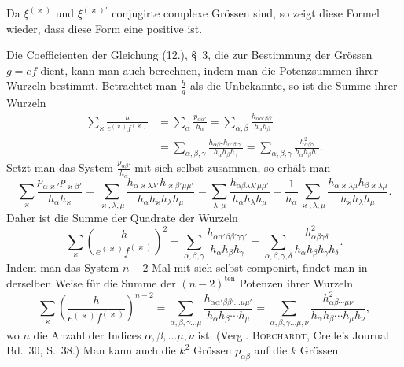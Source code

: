 \documentclass[11pt]{article}
\begin{document}
Da $\xi^{(\varkappa)}$ und $\xi^{(\varkappa)'}$ conjugirte complexe Grössen sind, so zeigt diese Formel wieder, dass diese Form eine positive ist.

Die Coefficienten der Gleichung (12.), \S~3, die zur Bestimmung der Grössen $g=ef$ dient, kann man auch berechnen, indem man die Potenzsummen ihrer Wurzeln bestimmt. Betrachtet man $\frac{h}{g}$ als die Unbekannte, so ist die Summe ihrer Wurzeln
\[
\begin{aligned}
\sum_\varkappa \frac{h}{e^{(\varkappa)}f^{(\varkappa)}}
&=\sum_\alpha \frac{p_{\alpha\alpha'}}{h_\alpha}
=\sum_{\alpha,\beta}\frac{h_{\alpha\alpha'\beta\beta'}}{h_\alpha h_\beta} \\
&=\sum_{\alpha,\beta,\gamma}\frac{h_{\alpha\beta\gamma}h_{\alpha'\beta'\gamma'}}{h_\alpha h_\beta h_\gamma}
=\sum_{\alpha,\beta,\gamma}\frac{h_{\alpha\beta\gamma}^{2}}{h_\alpha h_\beta h_\gamma}.
\end{aligned}
\]
Setzt man das System $\frac{p_{\alpha\beta'}}{h_\alpha}$ mit sich selbst zusammen, so erhält man
\[
\sum_\varkappa \frac{p_{\alpha\varkappa'}p_{\varkappa\beta'}}{h_\alpha h_\varkappa}
=\sum_{\varkappa,\lambda,\mu}\frac{h_{\alpha\varkappa\lambda\lambda'}h_{\varkappa\beta'\mu\mu'}}{h_\alpha h_\varkappa h_\lambda h_\mu}
=\sum_{\lambda,\mu}\frac{h_{\alpha\beta\lambda\lambda'\mu\mu'}}{h_\alpha h_\lambda h_\mu}
=\frac{1}{h_\alpha}\sum_{\varkappa,\lambda,\mu}\frac{h_{\alpha\varkappa\lambda\mu}h_{\beta\varkappa\lambda\mu}}{h_\varkappa h_\lambda h_\mu}.
\]
Daher ist die Summe der Quadrate der Wurzeln
\[
\sum_\varkappa\left(\frac{h}{e^{(\varkappa)}f^{(\varkappa)}}\right)^2
=\sum_{\alpha,\beta,\gamma}\frac{h_{\alpha\alpha'\beta\beta'\gamma\gamma'}}{h_\alpha h_\beta h_\gamma}
=\sum_{\alpha,\beta,\gamma,\delta}\frac{h_{\alpha\beta\gamma\delta}^{2}}{h_\alpha h_\beta h_\gamma h_\delta}.
\]
Indem man das System $n-2$ Mal mit sich selbst componirt, findet man in derselben Weise für die Summe der $(n-2)^{\text{ten}}$ Potenzen ihrer Wurzeln
\begin{equation*}\tag{8.}
\sum_\varkappa\left(\frac{h}{e^{(\varkappa)}f^{(\varkappa)}}\right)^{n-2}
=\sum_{\alpha,\beta,\gamma\ldots\mu}\frac{h_{\alpha\alpha'\beta\beta'\ldots\mu\mu'}}{h_\alpha h_\beta\cdots h_\mu}
=\sum_{\alpha,\beta,\gamma\ldots\mu,\nu}\frac{h_{\alpha\beta\cdots\mu\nu}^{2}}{h_\alpha h_\beta\cdots h_\mu h_\nu},
\end{equation*}
wo $n$ die Anzahl der Indices $\alpha,\beta,\ldots\mu,\nu$ ist. (Vergl. \textsc{Borchardt}, Crelle's Journal Bd.~30, S.~38.) Man kann auch die $k^2$ Grössen $p_{\alpha\beta}$ auf die $k$ Grössen
\end{document}

